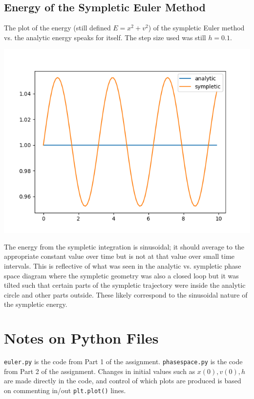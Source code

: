 \documentclass{article}
\begin{document}
\subsection{Energy of the Sympletic Euler Method}
The plot of the energy (still defined $ E = x^2 + v^2 $) of the sympletic Euler method vs. the analytic energy speaks for itself. The step size used was still $ h = 0.1 $.

\includegraphics[scale=0.9]{images/analytic_vs_sympletic_energy.png}

The energy from the sympletic integration is sinusoidal; it should average to the appropriate constant value over time but is not at that value over small time intervals. This is reflective of what was seen in the analytic vs. sympletic phase space diagram where the sympletic geometry was also a closed loop but it was tilted such that certain parts of the sympletic trajectory were inside the analytic circle and other parts outside. These likely correspond to the sinusoidal nature of the sympletic energy.

\section{Notes on Python Files}
\texttt{euler.py} is the code from Part 1 of the assignment. \texttt{phasespace.py} is the code from Part 2 of the assignment. Changes in initial values such as $ x(0), v(0), h $ are made directly in the code, and control of which plots are produced is based on commenting in/out \texttt{plt.plot()} lines.
\end{document}
